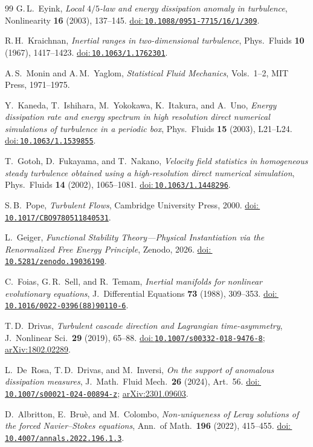 \documentclass[12pt,a4paper]{article}
\newcommand{\doilink}[1]{\href{https://doi.org/#1}{doi:\,\nolinkurl{#1}}}
\theoremstyle{breakdef}
\theoremstyle{breakplain}
\theoremstyle{breakdef}
\begin{document}
\begin{thebibliography}{99}
G.\,L.~Eyink,
\emph{Local $4/5$-law and energy dissipation anomaly in turbulence},
Nonlinearity \textbf{16} (2003), 137--145.
\doilink{10.1088/0951-7715/16/1/309}.

R.\,H.~Kraichnan,
\emph{Inertial ranges in two-dimensional turbulence},
Phys.\ Fluids \textbf{10} (1967), 1417--1423.
\doilink{10.1063/1.1762301}.

A.\,S.~Monin and A.\,M.~Yaglom,
\emph{Statistical Fluid Mechanics}, Vols.~1--2,
MIT Press, 1971--1975.

Y.~Kaneda, T.~Ishihara, M.~Yokokawa, K.~Itakura, and A.~Uno,
\emph{Energy dissipation rate and energy spectrum in high resolution
direct numerical simulations of turbulence in a periodic box},
Phys.\ Fluids \textbf{15} (2003), L21--L24.
\doilink{10.1063/1.1539855}.

T.~Gotoh, D.~Fukayama, and T.~Nakano,
\emph{Velocity field statistics in homogeneous steady turbulence
obtained using a high-resolution direct numerical simulation},
Phys.\ Fluids \textbf{14} (2002), 1065--1081.
\doilink{10.1063/1.1448296}.

S.\,B.~Pope,
\emph{Turbulent Flows},
Cambridge University Press, 2000.
\doilink{10.1017/CBO9780511840531}.

L.~Geiger, \emph{Functional Stability Theory---Physical Instantiation via the Renormalized Free Energy Principle},
Zenodo, 2026.
\doilink{10.5281/zenodo.19036190}.

C.~Foias, G.\,R.~Sell, and R.~Temam,
\emph{Inertial manifolds for nonlinear evolutionary equations},
J.~Differential Equations \textbf{73} (1988), 309--353.
\doilink{10.1016/0022-0396(88)90110-6}.

T.\,D.~Drivas,
\emph{Turbulent cascade direction and Lagrangian time-asymmetry},
J.~Nonlinear Sci.\ \textbf{29} (2019), 65--88.
\doilink{10.1007/s00332-018-9476-8};
\href{https://arxiv.org/abs/1802.02289}{arXiv:1802.02289}.

L.~De~Rosa, T.\,D.~Drivas, and M.~Inversi,
\emph{On the support of anomalous dissipation measures},
J.~Math.\ Fluid Mech.\ \textbf{26} (2024), Art.~56.
\doilink{10.1007/s00021-024-00894-z};
\href{https://arxiv.org/abs/2301.09603}{arXiv:2301.09603}.

D.~Albritton, E.~Bru\`e, and M.~Colombo,
\emph{Non-uniqueness of Leray solutions of the forced Navier--Stokes equations},
Ann.\ of Math.\ \textbf{196} (2022), 415--455.
\doilink{10.4007/annals.2022.196.1.3}.


\end{thebibliography}
\end{document}
